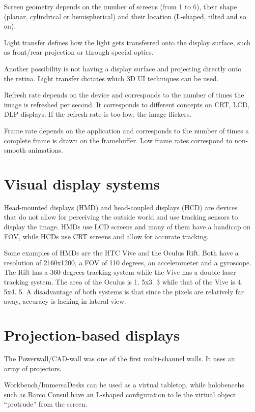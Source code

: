 \documentclass[a4paper]{article}
\begin{document}
Screen geometry depends on the number of screens (from 1 to 6), their
shape (planar, cylindrical or hemispherical) and their location
(L-shaped, tilted and so on).

Light transfer defines how the light gets transferred onto the display
surface, such as front/rear projection or through special optics.

Another possibility is not having a display surface and projecting
directly onto the retina.
Light transfer dictates which 3D UI techniques
can be used.

Refresh rate depends on the device and corresponds to the number of
times the image is refreshed per second.
It corresponds to different
concepts on CRT, LCD, DLP displays.
If the refresh rate is too low, the
image flickers.

Frame rate depends on the application and corresponds to the number of
times a complete frame is drawn on the framebuffer.
Low frame rates
correspond to non-smooth animations.

\section{Visual display systems}

Head-mounted displays (HMD) and head-coupled displays (HCD) are devices
that do not allow for perceiving the outside world and use tracking
sensors to display the image.
HMDs use LCD screens and many of them have
a handicap on FOV, while HCDs use CRT screens and allow for accurate
tracking.

Some examples of HMDs are the HTC Vive and the Oculus Rift.
Both have a
resolution of 2160x1200, a FOV of 110 degrees, an accelerometer and a
gyroscope.
The Rift has a 360-degrees tracking system while the Vive has
a double laser tracking system.
The area of the Oculus is 1.
5x3.
3 while
that of the Vive is 4.
5x4.
5.
A disadvantage of both systems is that
since the pixels are relatively far away, accuracy is lacking in lateral
view.

\section{Projection-based displays}

The Powerwall/CAD-wall was one of the first multi-channel walls.
It uses
an array of projectors.

Workbench/ImmersaDesks can be used as a virtual tabletop, while
holobencehs such as Barco Consul have an L-shaped configuration to le
the virtual object ``protrude'' from the screen.
\end{document}
